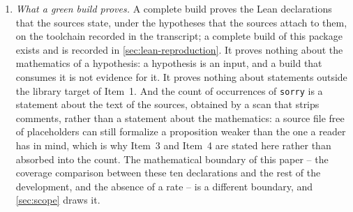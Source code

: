 \begin{enumerate}
\item \emph{What a green build proves.} A complete build proves the Lean
  declarations that the sources state, under the hypotheses that the sources
  attach to them, on the toolchain recorded in the transcript; a complete build
  of this package exists and is recorded in \cref{sec:lean-reproduction}. It
  proves nothing
  about the mathematics of a hypothesis: a hypothesis is an input, and a build
  that consumes it is not evidence for it. It proves nothing about statements
  outside the library target of Item~1. And the count of \NumCleanSorry{}
  occurrences of \texttt{sorry} is a statement about the text of the sources,
  obtained by a scan that strips comments, rather than a statement about the
  mathematics: a source file free of placeholders can still formalize a
  proposition weaker than the one a reader has in mind, which is why Item~3 and
  Item~4 are stated here rather than absorbed into the count. The mathematical
  boundary of this paper -- the coverage comparison between these ten
  declarations and the rest of the development, and the absence of a rate -- is a
  different boundary, and \cref{sec:scope} draws it.

\end{enumerate}
